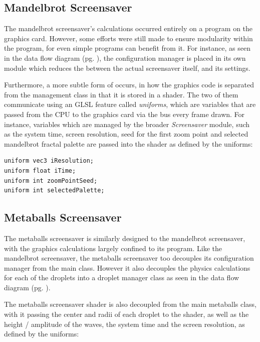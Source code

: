 \documentclass[10pt, openany]{book}
\begin{document}
\subsection{Mandelbrot Screensaver}
The mandelbrot screensaver's calculations occurred entirely on a  program on the graphics card. However, some efforts were still made to ensure modularity within the program, for even simple programs can benefit from it. For instance, as seen in the data flow diagram (pg. \pageref{app:mandelbrot-dfd}), the configuration manager is placed in its own module which reduces the  between the actual screensaver itself, and its settings.

Furthermore, a more subtle form of  occurs, in how the graphics code is separated from the management class in that it is stored in a shader. The two of them communicate using an \Gls{GLSL} feature called \textit{uniforms}, which are variables that are passed from the CPU to the graphics card via the bus every frame drawn. For instance, variables which are managed by the broader \textit{Screensaver} module, such as the system time, screen resolution, seed for the first zoom point and selected mandelbrot fractal palette are passed into the shader as defined by the uniforms:

\begin{verbatim}
uniform vec3 iResolution;
uniform float iTime;
uniform int zoomPointSeed;
uniform int selectedPalette;
\end{verbatim}

\subsection{Metaballs Screensaver}
The metaballs screensaver is similarly designed to the mandelbrot screensaver, with the graphics calculations largely confined to its  program. Like the mandelbrot screensaver, the metaballs screensaver too decouples its configuration manager from the main class. However it also decouples the physics calculations for each of the droplets into a droplet manager class as seen in the data flow diagram (pg. \pageref{app:metaballs-dfd}).

The metaballs screensaver shader is also decoupled from the main metaballs class, with it passing the center and radii of each droplet to the shader, as well as the height / amplitude of the waves, the system time and the screen resolution, as defined by the uniforms:
\end{document}
